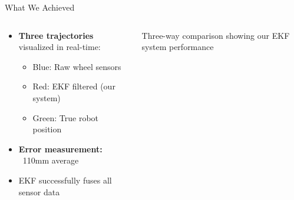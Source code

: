 \documentclass[10pt]{beamer}
\begin{document}
\begin{frame}{What We Achieved}
\begin{columns}
\begin{column}{0.6\textwidth}
\begin{itemize}
    \item \textbf{Three trajectories} visualized in real-time:
    \begin{itemize}
        \item Blue: Raw wheel sensors
        \item Red: EKF filtered (our system)
        \item Green: True robot position
    \end{itemize}
    \item \textbf{Error measurement:} ~110mm average
    \item EKF successfully fuses all sensor data
\end{itemize}
\end{column}
\begin{column}{0.38\textwidth}
\centering
{}

\vspace{1mm}
{\tiny Three-way comparison showing our EKF system performance}
\end{column}
\end{columns}
\end{frame}
\end{document}
